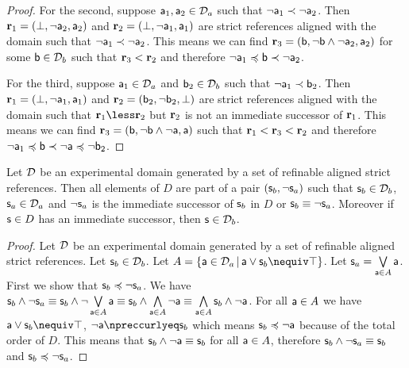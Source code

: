 \begin{mathSection}
\begin{proof}
		For the second, suppose $\stmt[a]_1, \stmt[a]_2 \in \edomain_a$ such that $\NOT \stmt[a]_1 \snarrower \NOT \stmt[a]_2$. Then $\refStmt_1 = ( \impossibility, \NOT \stmt[a]_2, \stmt[a]_2 )$ and  $\refStmt_2 = ( \impossibility, \NOT \stmt[a]_1, \stmt[a]_1)$ are strict references aligned with the domain such that $\NOT \stmt[a]_1 \snarrower \NOT \stmt[a]_2$. This means we can find $\refStmt_3 = ( \stmt[b], \NOT \stmt[b] \AND \NOT \stmt[a]_2, \stmt[a]_2 )$ for some $\stmt[b] \in \edomain_b$ such that $\refStmt_3 < \refStmt_2$ and therefore $\NOT \stmt[a]_1 \narrower \stmt[b] \snarrower \NOT \stmt[a]_2$.
		
		For the third, suppose $\stmt[a]_1 \in \edomain_a$ and $\stmt[b]_2\in \edomain_b$ such that $\NOT \stmt[a]_1 \snarrower \stmt[b]_2$. Then $\refStmt_1 = ( \impossibility, \NOT \stmt[a]_1, \stmt[a]_1 )$ and  $\refStmt_2 = ( \stmt[b]_2, \NOT \stmt[b]_2, \impossibility)$ are strict references aligned with the domain such that $\refStmt_1 \less \refStmt_2$ but $\refStmt_2$ is not an immediate successor of $\refStmt_1$. This means we can find $\refStmt_3 = ( \stmt[b], \NOT \stmt[b] \AND \NOT \stmt[a], \stmt[a] )$ such that $\refStmt_1 < \refStmt_3 < \refStmt_2$ and therefore $\NOT \stmt[a]_1 \narrower \stmt[b] \snarrower \NOT \stmt[a] \narrower \NOT \stmt[b]_2$.
	\end{proof}
	
	\begin{prop}\label{pm-pq-refinableIsPairOrdering}
		Let $\edomain$ be an experimental domain generated by a set of refinable aligned strict references. Then all elements of $D$ are part of a pair $(\stmt_b, \NOT \stmt_a)$ such that $\stmt_b \in \edomain_b$, $\stmt_a \in \edomain_a$ and $\NOT \stmt_a$ is the immediate successor of $\stmt_b$ in $D$ or $\stmt_b \equiv \NOT \stmt_a$. Moreover if $\stmt \in D$ has an immediate successor, then $\stmt \in \edomain_b$.
	\end{prop}
	\begin{proof}
		Let $\edomain$ be an experimental domain generated by a set of refinable aligned strict references. Let $\stmt_b \in \edomain_b$. Let $A=\{\stmt[a] \in \edomain_a \, | \, \stmt[a] \OR \stmt_b \nequiv \certainty \}$. Let $\stmt_a=\bigOR\limits_{\stmt[a] \in A} \stmt[a]$. First we show that $\stmt_b \narrower \NOT \stmt_a$. We have $\stmt_b \AND \NOT \stmt_a \equiv \stmt_b \AND \NOT \bigOR\limits_{\stmt[a] \in A} \stmt[a] \equiv \stmt_b \AND \bigAND\limits_{\stmt[a] \in A} \NOT \stmt[a] \equiv \bigAND\limits_{\stmt[a] \in A} \stmt_b \AND \NOT \stmt[a]$. For all $\stmt[a] \in A$ we have $\stmt[a] \OR \stmt_b \nequiv \certainty$, $\NOT \stmt[a] \nnarrower \stmt_b$ which means $\stmt_b \narrower \NOT \stmt[a]$ because of the total order of $D$. This means that $\stmt_b \AND \NOT \stmt[a] \equiv \stmt_b$ for all $\stmt[a] \in A$, therefore $\stmt_b \AND \NOT \stmt_a \equiv \stmt_b$ and $\stmt_b \narrower \NOT \stmt_a$.
		

\end{proof}
\end{mathSection}
